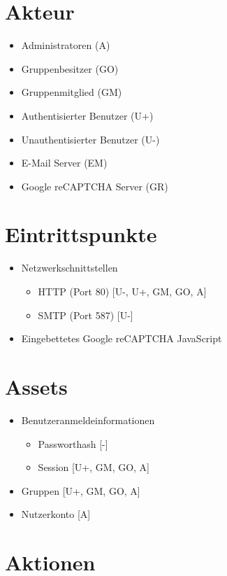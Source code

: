 \documentclass[fontsize=12pt,DIV=14,BCOR=10mm,a4paper,parskip=half-,ngerman,english,bibliography=totocnumbered]{scrreprt}
\begin{document}
\chapter{Akteur}

\begin{itemize}
  \item Administratoren (A)
  \item Gruppenbesitzer (GO)
  \item Gruppenmitglied (GM)
  \item Authentisierter Benutzer (U+)
  \item Unauthentisierter Benutzer (U-)
  \item E-Mail Server (EM)
  \item Google reCAPTCHA Server (GR)
\end{itemize}

\chapter{Eintrittspunkte}

\begin{itemize}
  \item Netzwerkschnittstellen
  \begin{itemize}
    \item HTTP (Port 80)  [U-, U+, GM, GO, A]
    \item SMTP (Port 587) [U-]
  \end{itemize}
  \item Eingebettetes Google reCAPTCHA JavaScript
\end{itemize}

\chapter{Assets}

\begin{itemize}
  \item Benutzeranmeldeinformationen
  \begin{itemize}
    \item Passworthash [-]
    \item Session [U+, GM, GO, A]
  \end{itemize}
  \item Gruppen [U+, GM, GO, A]
  \item Nutzerkonto [A]
\end{itemize}

\chapter{Aktionen}
\end{document}
